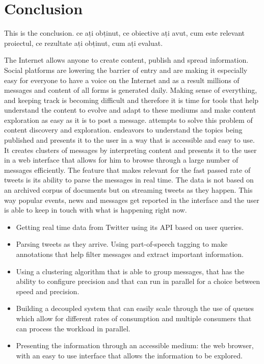 \chapter{Conclusion}
\label{chapter:conclusion}

This is the conclusion.  ce ați obținut, ce obiective ați avut, cum este relevant proiectul, ce rezultate ați obținut, cum ați evaluat.

The Internet allows anyone to create content, publish and spread information. Social platforms are lowering the barrier of entry and are making it especially easy for everyone to have a voice on the Internet and as a result millions of messages and content of all forms is generated daily. Making sense of everything, and keeping track is becoming difficult and therefore it is time for tools that help understand the content to evolve and adapt to these mediums and make content exploration as easy as it is to post a message.
\newline
{\project}  attempts to solve this problem of content discovery and exploration. {\project}  endeavors to understand the topics being published and presents it to the user in a way that is accessible and easy to use. It creates clusters of messages by interpreting content and presents it to the user in a web interface that allows for him to browse through a large number of messages efficiently.
\newline
The feature that makes {\project}  relevant for the fast passed rate of tweets is its ability to parse the messages in real time. The data is not based on an archived corpus of documents but on streaming tweets as they happen. This way popular events, news and messages get reported in the interface and the user is able to keep in touch with what is happening right now.
\newline
\begin{itemize}
	\item Getting real time data from Twitter using its API based on user queries.
	\item Parsing tweets as they arrive. Using part-of-speech tagging to make annotations that help filter messages and extract important information.
	\item Using a clustering algorithm that is able to group messages, that has the ability to configure precision and that can run in parallel for a choice between speed and precision. 
	\item Building a decoupled system that can easily scale through the use of queues which allow for different rates of consumption and multiple consumers that can process the workload in parallel.
	\item Presenting the information through an accessible medium: the web browser, with an easy to use interface that allows the information to be explored.
\end{itemize}
